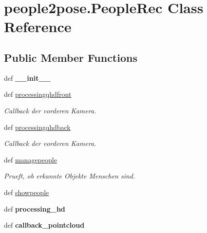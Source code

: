 \hypertarget{classpeople2pose_1_1PeopleRec}{\section{people2pose.\-People\-Rec Class Reference}
\label{classpeople2pose_1_1PeopleRec}
}
\subsection*{Public Member Functions}
\begin{DoxyCompactItemize}
\item 
\hypertarget{classpeople2pose_1_1PeopleRec_ad1219a3141dc4162820c603c1e58bfb7}{def {\bfseries \-\_\-\-\_\-init\-\_\-\-\_\-}}\label{classpeople2pose_1_1PeopleRec_ad1219a3141dc4162820c603c1e58bfb7}

\item 
def \hyperlink{classpeople2pose_1_1PeopleRec_ab902d23b67614051acfd072d73a6a5e6}{processingqhdfront}
\begin{DoxyCompactList}\small\item\em Callback der vorderen Kamera. \end{DoxyCompactList}\item 
def \hyperlink{classpeople2pose_1_1PeopleRec_a18d6ada30e36ef07a8120a64e2b0fc1a}{processingqhdback}
\begin{DoxyCompactList}\small\item\em Callback der vorderen Kamera. \end{DoxyCompactList}\item 
def \hyperlink{classpeople2pose_1_1PeopleRec_a1ec343f6595ac5ba6204e94cf0d3c328}{managepeople}
\begin{DoxyCompactList}\small\item\em Prueft, ob erkannte Objekte Menschen sind. \end{DoxyCompactList}\item 
def \hyperlink{classpeople2pose_1_1PeopleRec_a246f9274412d6e72c64c559fb8248552}{showpeople}
\item 
\hypertarget{classpeople2pose_1_1PeopleRec_a3ded5b9a9b302bb29e5882944b447fc0}{def {\bfseries processing\-\_\-hd}}\label{classpeople2pose_1_1PeopleRec_a3ded5b9a9b302bb29e5882944b447fc0}

\item 
\hypertarget{classpeople2pose_1_1PeopleRec_af7aa82a401458fa5e6da47538247e8e4}{def {\bfseries callback\-\_\-pointcloud}}\label{classpeople2pose_1_1PeopleRec_af7aa82a401458fa5e6da47538247e8e4}


\end{DoxyCompactItemize}
